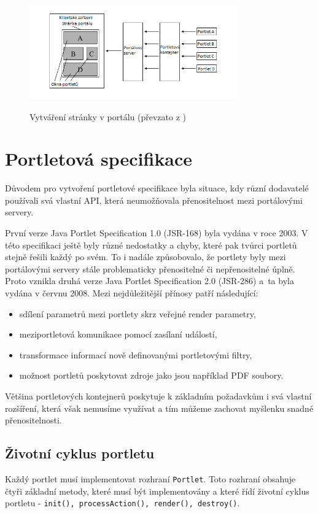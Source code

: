 \documentclass{fithesis}
\begin{document}
\begin{figure}[htp]
\centering
\includegraphics[width=340px]{images/vytvareni_stranky_v_portalu.png}
\label{fig:vytvareni_stranky}
\caption{Vytváření stránky v portálu (převzato z \cite{jsr-286})}
\end{figure}

\section{Portletová specifikace}
Důvodem pro vytvoření portletové specifikace byla situace, kdy různí dodavatelé používali svá vlastní API, která neumožňovala přenositelnost mezi portálovými servery.

První verze Java Portlet Specification 1.0 (JSR-168) byla vydána v roce 2003. V této specifikaci ještě byly různé nedostatky a chyby, které pak tvůrci portletů stejně řešili každý po svém. To i nadále způsobovalo, že portlety byly mezi portálovými servery stále problematicky přenositelné či nepřenositelné úplně. Proto vznikla druhá verze Java Portlet Specification 2.0 (JSR-286) a~ta byla vydána v červnu 2008. Mezi nejdůležitější přínosy patří následující:
\begin{itemize}
\item sdílení parametrů mezi portlety skrz veřejné render parametry,
\item meziportletová komunikace pomocí zasílaní událostí,
\item transformace informací nově definovanými portletovými filtry,
\item možnost portletů poskytovat zdroje jako jsou například PDF soubory.
\end{itemize}
Většina portletových kontejnerů poskytuje k základním požadavkům i svá vlastní rozšíření, která však  nemusíme využívat a tím můžeme zachovat myšlenku snadné přenositelnosti.

\subsection*{Životní cyklus portletu}
Každý portlet musí implementovat rozhraní \verb|Portlet|. Toto rozhraní obsahuje čtyři základní metody, které musí být implementovány a které řídí životní cyklus portletu - \verb|init(), processAction(), render(), destroy()|.
\end{document}
